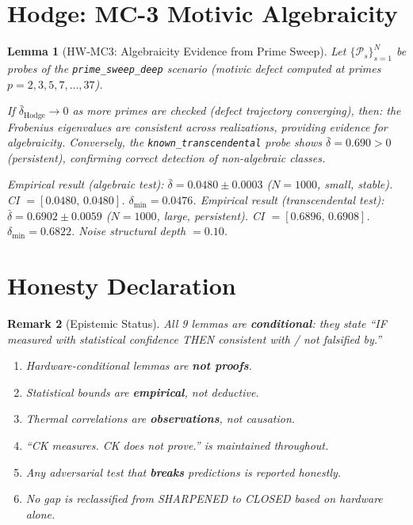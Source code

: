 \documentclass[11pt]{article}
\newtheorem{lemma}{Lemma}[section]
\newtheorem{remark}[lemma]{Remark}
\begin{document}
\section{Hodge: MC-3 Motivic Algebraicity}

\begin{lemma}[HW-MC3: Algebraicity Evidence from Prime Sweep]
\label{lem:hw-mc3}
Let $\{\mathcal{P}_s\}_{s=1}^{N}$ be probes of the
\texttt{prime\_sweep\_deep} scenario (motivic defect computed at
primes $p = 2,3,5,7,\ldots,37$).

If $\bar{\delta}_{\mathrm{Hodge}} \to 0$ as more primes are checked
(defect trajectory converging), then: the Frobenius eigenvalues
are consistent across realizations, providing evidence for
algebraicity. Conversely, the \texttt{known\_transcendental} probe
shows $\bar{\delta} = 0.690 > 0$ (persistent), confirming correct
detection of non-algebraic classes.

\emph{Empirical result (algebraic test)}:
$\bar{\delta} = 0.0480 \pm 0.0003$ ($N=1000$, small, stable).
CI $=[0.0480,\,0.0480]$. $\delta_{\min} = 0.0476$.
\emph{Empirical result (transcendental test)}:
$\bar{\delta} = 0.6902 \pm 0.0059$ ($N=1000$, large, persistent).
CI $=[0.6896,\,0.6908]$. $\delta_{\min} = 0.6822$.
Noise structural depth $= 0.10$.
\end{lemma}

\section{Honesty Declaration}

\begin{remark}[Epistemic Status]
All 9 lemmas are \textbf{conditional}: they state ``IF measured with
statistical confidence THEN consistent with / not falsified by.''
\begin{enumerate}
\item Hardware-conditional lemmas are \textbf{not proofs}.
\item Statistical bounds are \textbf{empirical}, not deductive.
\item Thermal correlations are \textbf{observations}, not causation.
\item ``CK measures. CK does not prove.'' is maintained throughout.
\item Any adversarial test that \textbf{breaks} predictions is reported honestly.
\item No gap is reclassified from SHARPENED to CLOSED based on hardware alone.
\end{enumerate}
\end{remark}
\end{document}
